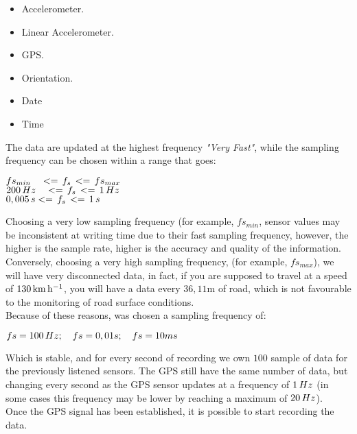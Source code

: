 \documentclass[tesi]{subfiles}
\begin{document}
\begin{itemize}
\item Accelerometer.
\item Linear Accelerometer.
\item GPS.
\item Orientation.
\item Date
\item Time
\end{itemize}


\noindent The data are updated at the highest frequency \textit{"Very Fast"}, while the sampling frequency can be chosen within a range that goes:


\begin{center}
$fs_{min} \quad <= \thinspace f_{s} \thinspace <= \thinspace fs_{max}$\\
$200 \thinspace Hz \quad <= \thinspace f_{s} \thinspace <= \thinspace 1 \thinspace Hz$\\
$0,005 \thinspace s <= \thinspace f_{s} \thinspace <= \thinspace 1 \thinspace s $
\end{center}


\noindent Choosing a very low sampling frequency (for example, $fs_{min}$, sensor values may be inconsistent at writing time due to their fast sampling frequency, however, the higher is the sample rate, higher is the accuracy and quality of the information.\\
Conversely, choosing a very high sampling frequency, (for example, $fs_{max}$), we will have very disconnected data, in fact, if you are supposed to travel at a speed of $130 \thinspace \si{\km\per\hour}$, you will have a data every $36,11  \si{\meter}$ of road, which is not favourable to the monitoring of road surface conditions.\\
Because of these reasons, was chosen a sampling frequency of:
\begin{center}
$fs = 100 \thinspace Hz; \quad fs = 0,01s; \quad fs = 10ms$
\end{center}

\noindent Which is stable, and for every second of recording we own $100$ sample of data for the previously listened sensors. The GPS still have the same number of data, but changing every second as the GPS sensor updates at a frequency of $1 \thinspace Hz$ (in some cases this frequency may be lower by reaching a maximum of $20 \thinspace Hz$).\\
Once the GPS signal has been established, it is possible to start recording the data.
 
\end{document}
